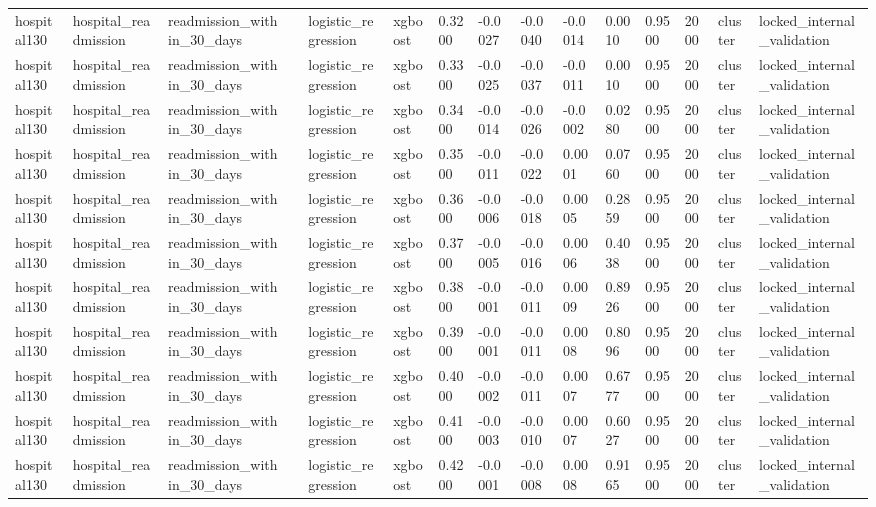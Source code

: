 \begin{tabular}{lllllllllllllll}
hospital130 & hospital\_readmission & readmission\_within\_30\_days &  & logistic\_regression & xgboost & 0.3200 & -0.0027 & -0.0040 & -0.0014 & 0.0010 & 0.9500 & 2000 & cluster & locked\_internal\_validation \\
hospital130 & hospital\_readmission & readmission\_within\_30\_days &  & logistic\_regression & xgboost & 0.3300 & -0.0025 & -0.0037 & -0.0011 & 0.0010 & 0.9500 & 2000 & cluster & locked\_internal\_validation \\
hospital130 & hospital\_readmission & readmission\_within\_30\_days &  & logistic\_regression & xgboost & 0.3400 & -0.0014 & -0.0026 & -0.0002 & 0.0280 & 0.9500 & 2000 & cluster & locked\_internal\_validation \\
hospital130 & hospital\_readmission & readmission\_within\_30\_days &  & logistic\_regression & xgboost & 0.3500 & -0.0011 & -0.0022 & 0.0001 & 0.0760 & 0.9500 & 2000 & cluster & locked\_internal\_validation \\
hospital130 & hospital\_readmission & readmission\_within\_30\_days &  & logistic\_regression & xgboost & 0.3600 & -0.0006 & -0.0018 & 0.0005 & 0.2859 & 0.9500 & 2000 & cluster & locked\_internal\_validation \\
hospital130 & hospital\_readmission & readmission\_within\_30\_days &  & logistic\_regression & xgboost & 0.3700 & -0.0005 & -0.0016 & 0.0006 & 0.4038 & 0.9500 & 2000 & cluster & locked\_internal\_validation \\
hospital130 & hospital\_readmission & readmission\_within\_30\_days &  & logistic\_regression & xgboost & 0.3800 & -0.0001 & -0.0011 & 0.0009 & 0.8926 & 0.9500 & 2000 & cluster & locked\_internal\_validation \\
hospital130 & hospital\_readmission & readmission\_within\_30\_days &  & logistic\_regression & xgboost & 0.3900 & -0.0001 & -0.0011 & 0.0008 & 0.8096 & 0.9500 & 2000 & cluster & locked\_internal\_validation \\
hospital130 & hospital\_readmission & readmission\_within\_30\_days &  & logistic\_regression & xgboost & 0.4000 & -0.0002 & -0.0011 & 0.0007 & 0.6777 & 0.9500 & 2000 & cluster & locked\_internal\_validation \\
hospital130 & hospital\_readmission & readmission\_within\_30\_days &  & logistic\_regression & xgboost & 0.4100 & -0.0003 & -0.0010 & 0.0007 & 0.6027 & 0.9500 & 2000 & cluster & locked\_internal\_validation \\
hospital130 & hospital\_readmission & readmission\_within\_30\_days &  & logistic\_regression & xgboost & 0.4200 & -0.0001 & -0.0008 & 0.0008 & 0.9165 & 0.9500 & 2000 & cluster & locked\_internal\_validation \\

\end{tabular}
